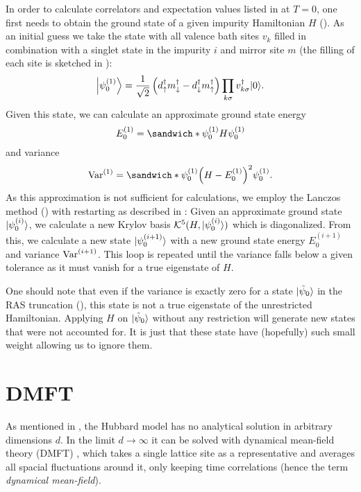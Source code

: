 In order to calculate correlators and expectation values listed in
 at $T=0$,
one first needs to obtain the ground state of a given impurity Hamiltonian $H$
().
As an initial guess we take the state with all valence bath sites $v_k$ filled in combination with
a singlet state in the impurity $i$ and mirror site $m$
(the filling of each site is sketched in ):
\begin{equation}
    \ket*{\psi_0^{(1)}}
    =
    \frac{1}{\sqrt{2}}
    \left(d^\dag_\uparrow m^\dag_\downarrow - d^\dag_\downarrow m^\dag_\uparrow\right)
    \prod_{k\sigma} v^\dag_{k\sigma}
    \ket{0}.
\end{equation}
Given this state, we can calculate an approximate ground state energy
\begin{equation}
    E_0^{(1)} = \sandwich*{\psi_0^{(1)}}{H}{\psi_0^{(1)}}
\end{equation}
and variance
\begin{equation}
    \var^{(1)}
    =
    \sandwich*{\psi_0^{(1)}}{\left(H - E_0^{(1)}\right)^2}{\psi_0^{(1)}}.
\end{equation}
As this approximation is not sufficient for calculations,
we employ the Lanczos method () with restarting
as described in \cite{Lu2014}:
Given an approximate ground state $\ket{\psi_0^{(i)}}$,
we calculate a new Krylov basis $\mathcal{K}^5(H, \ket{\psi_0^{(i)}})$ which is diagonalized.
From this, we calculate a new state $\ket{\psi_0^{(i+1)}}$
with a new ground state energy $E_0^{(i+1)}$
and variance $\var^{(i+1)}$.
This loop is repeated until the variance falls below a given tolerance
as it must vanish for a true eigenstate of $H$.

One should note that even if the variance is exactly zero for a state $\ket{\tilde\psi_0}$
in the RAS truncation (),
this state is not a true eigenstate of the unrestricted Hamiltonian.
Applying $H$ on $\ket{\tilde\psi_0}$ without any restriction
will generate new states \cite{Lu2014} that were not accounted for.
It is just that these state have (hopefully) such small weight allowing us to ignore them.

\section{DMFT}
\label{sec:dmft}

As mentioned in ,
the Hubbard model has no analytical solution in arbitrary dimensions $d$.
In the limit $d\to\infty$ it can be solved with
dynamical mean-field theory (DMFT) \cite{Georges1996},
which takes a single lattice site as a representative
and averages all spacial fluctuations around it, only keeping time correlations
(hence the term \emph{dynamical mean-field}).

